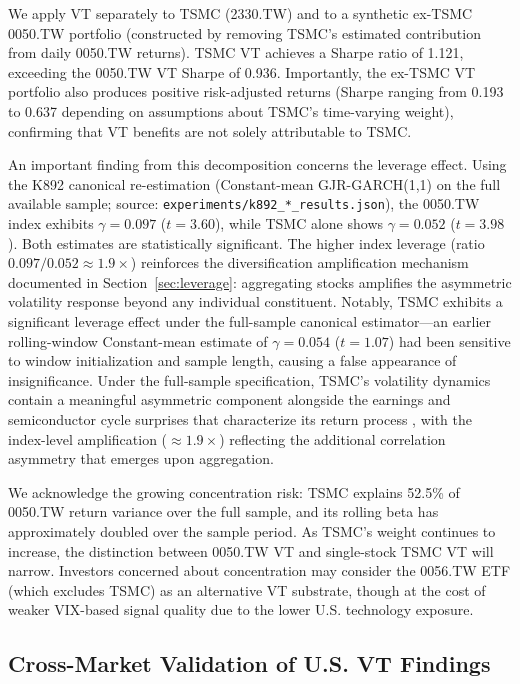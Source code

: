 We apply VT separately to TSMC (2330.TW) and to a synthetic ex-TSMC 0050.TW portfolio (constructed by removing TSMC's estimated contribution from daily 0050.TW returns). TSMC VT achieves a Sharpe ratio of 1.121, exceeding the 0050.TW VT Sharpe of 0.936. Importantly, the ex-TSMC VT portfolio also produces positive risk-adjusted returns (Sharpe ranging from 0.193 to 0.637 depending on assumptions about TSMC's time-varying weight), confirming that VT benefits are not solely attributable to TSMC.

An important finding from this decomposition concerns the leverage effect. Using the K892 canonical re-estimation (Constant-mean GJR-GARCH(1,1) on the full available sample; source: \texttt{experiments/k892\_*\_results.json}), the 0050.TW index exhibits $\gamma = 0.097$ ($t = 3.60$), while TSMC alone shows $\gamma = 0.052$ ($t = 3.98$). Both estimates are statistically significant. The higher index leverage (ratio $0.097/0.052 \approx 1.9\times$) reinforces the diversification amplification mechanism documented in Section~\ref{sec:leverage}: aggregating stocks amplifies the asymmetric volatility response beyond any individual constituent. Notably, TSMC exhibits a significant leverage effect under the full-sample canonical estimator---an earlier rolling-window Constant-mean estimate of $\gamma = 0.054$ ($t = 1.07$) had been sensitive to window initialization and sample length, causing a false appearance of insignificance. Under the full-sample specification, TSMC's volatility dynamics contain a meaningful asymmetric component alongside the earnings and semiconductor cycle surprises that characterize its return process \citep{black1976}, with the index-level amplification ($\approx 1.9\times$) reflecting the additional correlation asymmetry that emerges upon aggregation.

We acknowledge the growing concentration risk: TSMC explains 52.5\% of 0050.TW return variance over the full sample, and its rolling beta has approximately doubled over the sample period. As TSMC's weight continues to increase, the distinction between 0050.TW VT and single-stock TSMC VT will narrow. Investors concerned about concentration may consider the 0056.TW ETF (which excludes TSMC) as an alternative VT substrate, though at the cost of weaker VIX-based signal quality due to the lower U.S. technology exposure.

\subsection{Cross-Market Validation of U.S. VT Findings}
\label{sec:cross_validation}

